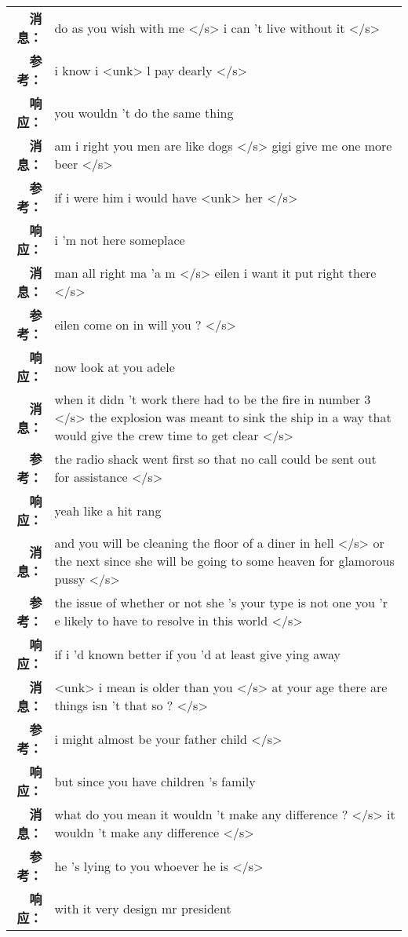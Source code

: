 \begin{tabularx}{\textwidth}{@{}rX@{}}%
\toprule%
\midrule%
\textbf{消息：}&do as you wish with me </s> i can 't live without it  </s>\\%
\textbf{参考：}& i know i <unk> l pay dearly </s>\\%
\textbf{响应：}&you wouldn 't do the same thing\\%
\midrule%
\textbf{消息：}&am i right you men are like dogs </s> gigi give me one more beer  </s>\\%
\textbf{参考：}& if i were him i would have <unk> her </s>\\%
\textbf{响应：}&i 'm not here someplace\\%
\midrule%
\textbf{消息：}&man all right ma 'a m </s> eilen i want it put right there  </s>\\%
\textbf{参考：}& eilen come on in will you ? </s>\\%
\textbf{响应：}&now look at you adele\\%
\midrule%
\textbf{消息：}&when it didn 't work there had to be the fire in number 3 </s> the explosion was meant to sink the ship in a way that would give the crew time to get clear  </s>\\%
\textbf{参考：}& the radio shack went first so that no call could be sent out for assistance </s>\\%
\textbf{响应：}&yeah like a hit rang\\%
\midrule%
\textbf{消息：}&and you will be cleaning the floor of a diner in hell </s> or the next since she will be going to some heaven for glamorous pussy  </s>\\%
\textbf{参考：}& the issue of whether or not she 's your type is not one you 'r e likely to have to resolve in this world </s>\\%
\textbf{响应：}&if i 'd known better if you 'd at least give ying away\\%
\midrule%
\textbf{消息：}&<unk> i mean is older than you </s> at your age there are things isn 't that so ?  </s>\\%
\textbf{参考：}& i might almost be your father child </s>\\%
\textbf{响应：}&but since you have children 's family\\%
\midrule%
\textbf{消息：}&what do you mean it wouldn 't make any difference ? </s> it wouldn 't make any difference  </s>\\%
\textbf{参考：}& he 's lying to you whoever he is </s>\\%
\textbf{响应：}&with it very design mr president\\%

\end{tabularx}
